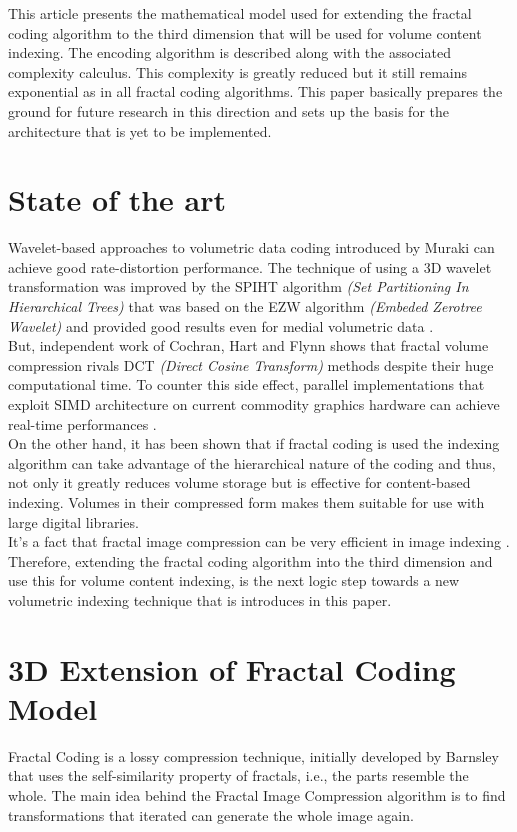 \documentclass[10pt, conference, compsocconf]{IEEEtran}
\begin{document}
This article presents the mathematical model used for extending the fractal coding algorithm to the third dimension that will be used for volume content indexing. The encoding algorithm is described along with the associated complexity calculus. This complexity is greatly reduced but it still remains exponential as in all fractal coding algorithms. This paper basically prepares the ground for future research in this direction and sets up the basis for the architecture that is yet to be implemented.~\\

\section{State of the art} 
Wavelet-based approaches to volumetric data coding introduced by Muraki \cite{Mur93} can achieve good rate-distortion performance. The technique of using a 3D wavelet transformation was improved by the SPIHT algorithm \cite{Sai96} \emph{(Set Partitioning In Hierarchical Trees)} that was based on the EZW algorithm \cite{Luo96} \emph{(Embeded Zerotree Wavelet)} and provided good results even for medial volumetric data \cite{Xio99}.~\\

But, independent work of Cochran, Hart and Flynn \cite{Coc96} shows that fractal volume compression rivals DCT \emph{(Direct Cosine Transform)} methods despite their huge computational time. To counter this side effect, parallel implementations that exploit SIMD architecture on current commodity graphics hardware can achieve real-time performances \cite{Err05}.~\\

On the other hand, it has been shown that if fractal coding is used \cite{Slo94} the indexing algorithm can take advantage of the hierarchical nature of the coding and thus, not only it greatly reduces volume storage but is effective for content-based indexing. Volumes in their compressed form makes them suitable for use with large digital libraries.~\\
	
It's a fact that fractal image compression can be very efficient in image indexing \cite{Che95}. Therefore, extending the fractal coding algorithm into the third dimension and use this for volume content indexing, is the next logic step towards a new volumetric indexing technique that is introduces in this paper.~\\

\section{3D Extension of Fractal Coding Model}
Fractal Coding is a lossy compression technique, initially developed by Barnsley \cite{Bar88,Bar92} that uses the self-similarity property of fractals, i.e., the parts resemble the whole. The main idea behind the Fractal Image Compression algorithm \cite{Fis95,Fis91} is to find transformations that iterated can generate the whole image again.~\\
\end{document}
